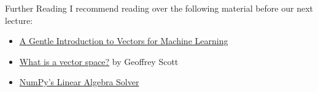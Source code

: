 \documentclass[handout]{beamer}
\begin{document}
\begin{frame}{Further Reading}
    I recommend reading over the following material before our next lecture:
    \begin{itemize}
        \item \href{https://machinelearningmastery.com/gentle-introduction-vectors-machine-learning/}{A Gentle Introduction to Vectors for Machine Learning}
        \item \href{http://www.math.toronto.edu/gscott/WhatVS.pdf}{What is a vector space?} by Geoffrey Scott
        \item \href{https://numpy.org/doc/stable/reference/generated/numpy.linalg.solve.html}{NumPy's Linear Algebra Solver}
    \end{itemize}
\end{frame}
\end{document}
